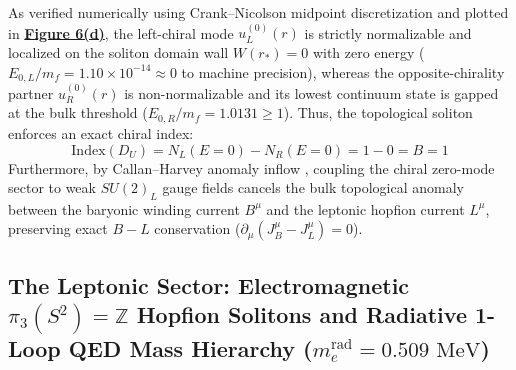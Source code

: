 \documentclass[10pt,aps,prd,twocolumn,superscriptaddress,nofootinbib,floatfix,longbibliography,showkeys]{revtex4-2}
\begin{document}
As verified numerically using Crank--Nicolson midpoint discretization and plotted in \textbf{\hyperref[fig:fig6]{Figure 6(d)}}, the left-chiral mode $u_L^{(0)}(r)$ is strictly normalizable and localized on the soliton domain wall $W(r_*) = 0$ with zero energy ($E_{0,L}/m_f = 1.10 \times 10^{-14} \approx 0$ to machine precision), whereas the opposite-chirality partner $u_R^{(0)}(r)$ is non-normalizable and its lowest continuum state is gapped at the bulk threshold ($E_{0,R}/m_f = 1.0131 \ge 1$). Thus, the topological soliton enforces an exact chiral index:
\begin{equation}
\text{Index}(D_U) = N_L(E=0) - N_R(E=0) = 1 - 0 = B = 1
\end{equation}
Furthermore, by Callan--Harvey anomaly inflow \cite{ref35,ref36}, coupling the chiral zero-mode sector to weak $SU(2)_L$ gauge fields cancels the bulk topological anomaly between the baryonic winding current $B^\mu$ and the leptonic hopfion current $L^\mu$, preserving exact $B - L$ conservation ($\partial_\mu(J_B^\mu - J_L^\mu) = 0$).


\subsection{The Leptonic Sector: Electromagnetic $\pi_3(S^2) = \mathbb{Z}$ Hopfion Solitons and Radiative 1-Loop QED Mass Hierarchy ($m_e^{\text{rad}} = 0.509\text{ MeV}$)}\label{sec:7.3}
\end{document}

